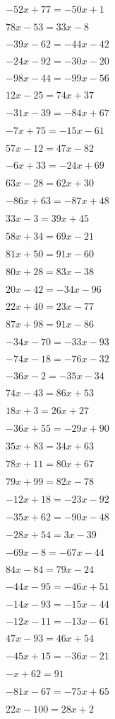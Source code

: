 \item $-52x+77 = -50x+1$
\item $78x-53 = 33x-8$
\item $-39x-62 = -44x-42$
\item $-24x-92 = -30x-20$
\item $-98x-44 = -99x-56$
\item $12x-25 = 74x+37$
\item $-31x-39 = -84x+67$
\item $-7x+75 = -15x-61$
\item $57x-12 = 47x-82$
\item $-6x+33 = -24x+69$
\item $63x-28 = 62x+30$
\item $-86x+63 = -87x+48$
\item $33x-3 = 39x+45$
\item $58x+34 = 69x-21$
\item $81x+50 = 91x-60$
\item $80x+28 = 83x-38$
\item $20x-42 = -34x-96$
\item $22x+40 = 23x-77$
\item $87x+98 = 91x-86$
\item $-34x-70 = -33x-93$
\item $-74x-18 = -76x-32$
\item $-36x-2 = -35x-34$
\item $74x-43 = 86x+53$
\item $18x+3 = 26x+27$
\item $-36x+55 = -29x+90$
\item $35x+83 = 34x+63$
\item $78x+11 = 80x+67$
\item $79x+99 = 82x-78$
\item $-12x+18 = -23x-92$
\item $-35x+62 = -90x-48$
\item $-28x+54 = 3x-39$
\item $-69x-8 = -67x-44$
\item $84x-84 = 79x-24$
\item $-44x-95 = -46x+51$
\item $-14x-93 = -15x-44$
\item $-12x-11 = -13x-61$
\item $47x-93 = 46x+54$
\item $-45x+15 = -36x-21$
\item $-x+62 = 91$
\item $-81x-67 = -75x+65$
\item $22x-100 = 28x+2$
